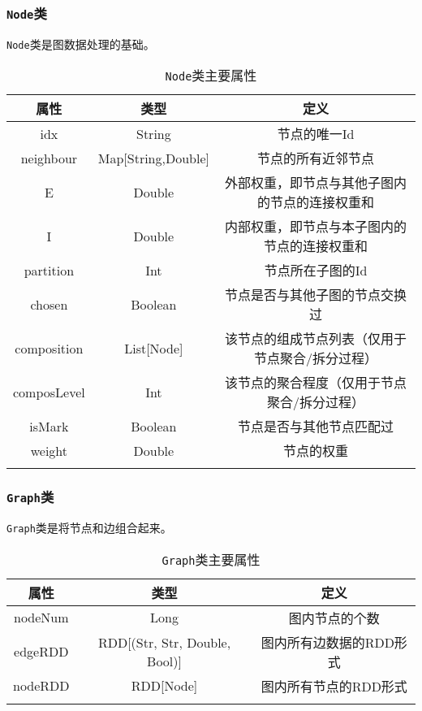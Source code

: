 \subsubsection{\texttt{Node}类}

\texttt{Node}类是图数据处理的基础。

\begin{table}[htbp]
    \centering
    \caption{\texttt{Node}类主要属性}
    \begin{tabular}{ccc}
        \hline
        属性& 类型 & 定义\\
        \hline
        idx         & String             & 节点的唯一Id \\
        neighbour   & Map[String,Double] & 节点的所有近邻节点\\
        E           & Double             & 外部权重，即节点与其他子图内的节点的连接权重和\\
        I           & Double             & 内部权重，即节点与本子图内的节点的连接权重和\\
        partition   & Int                & 节点所在子图的Id\\
        chosen      & Boolean            & 节点是否与其他子图的节点交换过\\
        composition & List[Node]         & 该节点的组成节点列表（仅用于节点聚合/拆分过程）\\
        composLevel & Int                & 该节点的聚合程度（仅用于节点聚合/拆分过程）\\
        isMark      & Boolean            & 节点是否与其他节点匹配过 \\
        weight      & Double             & 节点的权重\\
        \hline
        \centering
    \end{tabular}
\end{table}

\subsubsection{\texttt{Graph}类}

\texttt{Graph}类是将节点和边组合起来。

\begin{table}[htbp]
    \centering
    \caption{\texttt{Graph}类主要属性}
    \begin{tabular}{ccc}
        \hline
        属性& 类型 & 定义\\
        \hline
        nodeNum & Long & 图内节点的个数 \\
        edgeRDD & RDD[(Str, Str, Double, Bool)] & 图内所有边数据的RDD形式\\
        nodeRDD & RDD[Node] & 图内所有节点的RDD形式\\
        \hline
        \centering
    \end{tabular}
\end{table}


